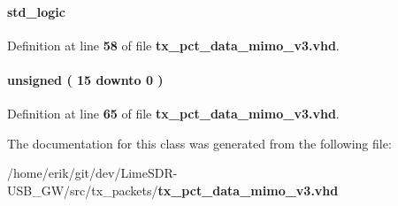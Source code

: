 \paragraph[{wrreq3}]{ {\bfseries \textcolor{comment}{std\+\_\+logic}\textcolor{vhdlchar}{ }} \hspace{0.3cm}{\ttfamily [Signal]}}\label{classtx__pct__data__mimo__v3_1_1arch_aba9cd3ac12e2a4b3cbd27db0760af292}


Definition at line {\bf 58} of file {\bf tx\+\_\+pct\+\_\+data\+\_\+mimo\+\_\+v3.\+vhd}.

\paragraph[{wrreq\+\_\+cnt}]{ {\bfseries \textcolor{comment}{unsigned}\textcolor{vhdlchar}{ }\textcolor{vhdlchar}{(}\textcolor{vhdlchar}{ }\textcolor{vhdlchar}{ } \textcolor{vhdldigit}{15} \textcolor{vhdlchar}{ }\textcolor{keywordflow}{downto}\textcolor{vhdlchar}{ }\textcolor{vhdlchar}{ } \textcolor{vhdldigit}{0} \textcolor{vhdlchar}{ }\textcolor{vhdlchar}{)}\textcolor{vhdlchar}{ }} \hspace{0.3cm}{\ttfamily [Signal]}}\label{classtx__pct__data__mimo__v3_1_1arch_a12f128afa70a54145414dc75b24e60c8}


Definition at line {\bf 65} of file {\bf tx\+\_\+pct\+\_\+data\+\_\+mimo\+\_\+v3.\+vhd}.



The documentation for this class was generated from the following file\+:\begin{DoxyCompactItemize}
\item 
/home/erik/git/dev/\+Lime\+S\+D\+R-\/\+U\+S\+B\+\_\+\+G\+W/src/tx\+\_\+packets/{\bf tx\+\_\+pct\+\_\+data\+\_\+mimo\+\_\+v3.\+vhd}\end{DoxyCompactItemize}
